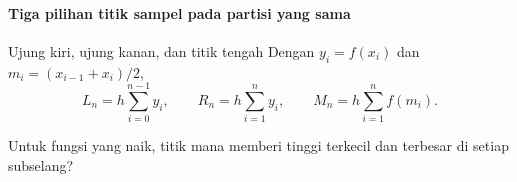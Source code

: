 \documentclass{../../kalkulus-ppt}
\begin{document}
\begin{frame}{\insertsection}
    \framesubtitle{Tiga pilihan titik sampel pada partisi yang sama}
    \begin{block}{Ujung kiri, ujung kanan, dan titik tengah}
        Dengan $y_i=f(x_i)$ dan $m_i=(x_{i-1}+x_i)/2$,
        \[
            L_n=h\sum_{i=0}^{n-1}y_i,\qquad
            R_n=h\sum_{i=1}^{n}y_i,\qquad
            M_n=h\sum_{i=1}^{n} f(m_i).
        \]
    \end{block}
    \begin{contoh}
        Untuk fungsi yang naik, titik mana memberi tinggi terkecil dan terbesar
        di setiap subselang?
    \end{contoh}
\end{frame}
\end{document}
